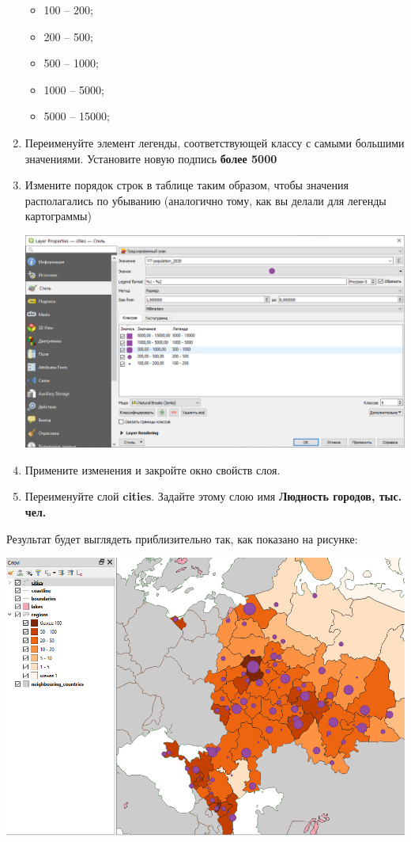 \documentclass[
  12pt,
]{book}
\providecommand{\tightlist}{%
  \setlength{\itemsep}{0pt}\setlength{\parskip}{0pt}}
\begin{document}
\begin{enumerate}
  \begin{itemize}
  \tightlist
  \item
    100 -- 200;
  \item
    200 -- 500;
  \item
    500 -- 1000;
  \item
    1000 -- 5000;
  \item
    5000 -- 15000;
  \end{itemize}
\item
  Переименуйте элемент легенды, соответствующей классу с самыми большими значениями. Установите новую подпись \textbf{более 5000}
\item
  Измените порядок строк в таблице таким образом, чтобы значения располагались по убыванию (аналогично тому, как вы делали для легенды картограммы)

  \includegraphics{images/Ex03/diagram.png}
\item
  Примените изменения и закройте окно свойств слоя.
\item
  Переименуйте слой \textbf{cities}. Задайте этому слою имя \textbf{Людность городов, тыс. чел.}
\end{enumerate}

Результат будет выглядеть приблизительно так, как показано на рисунке:

\includegraphics{images/Ex03/diagramResult.png}
\end{document}
